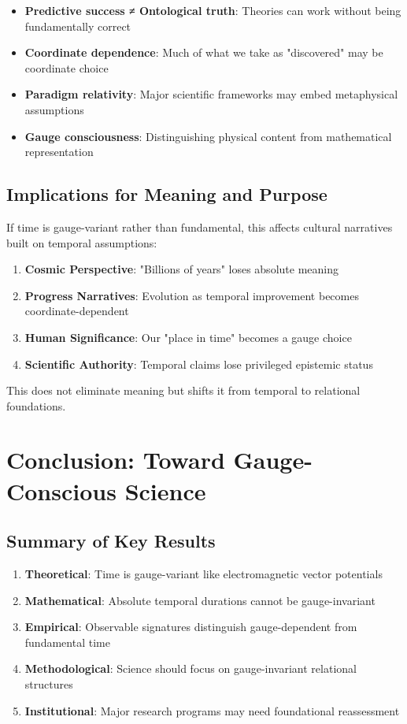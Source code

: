 \documentclass[11pt]{article}
\theoremstyle{definition}
\theoremstyle{plain}
\theoremstyle{remark}
\begin{document}
\begin{keypoint}
\begin{itemize}
\item \textbf{Predictive success ≠ Ontological truth}: Theories can work without being fundamentally correct
\item \textbf{Coordinate dependence}: Much of what we take as "discovered" may be coordinate choice  
\item \textbf{Paradigm relativity}: Major scientific frameworks may embed metaphysical assumptions
\item \textbf{Gauge consciousness}: Distinguishing physical content from mathematical representation
\end{itemize}
\end{keypoint}

\subsection{Implications for Meaning and Purpose}

If time is gauge-variant rather than fundamental, this affects cultural narratives built on temporal assumptions:

\begin{enumerate}
\item \textbf{Cosmic Perspective}: "Billions of years" loses absolute meaning
\item \textbf{Progress Narratives}: Evolution as temporal improvement becomes coordinate-dependent
\item \textbf{Human Significance}: Our "place in time" becomes a gauge choice
\item \textbf{Scientific Authority}: Temporal claims lose privileged epistemic status
\end{enumerate}

This does not eliminate meaning but shifts it from temporal to relational foundations.

\section{Conclusion: Toward Gauge-Conscious Science}

\subsection{Summary of Key Results}

\begin{enumerate}
\item \textbf{Theoretical}: Time is gauge-variant like electromagnetic vector potentials
\item \textbf{Mathematical}: Absolute temporal durations cannot be gauge-invariant
\item \textbf{Empirical}: Observable signatures distinguish gauge-dependent from fundamental time
\item \textbf{Methodological}: Science should focus on gauge-invariant relational structures
\item \textbf{Institutional}: Major research programs may need foundational reassessment
\end{enumerate}
\end{document}
